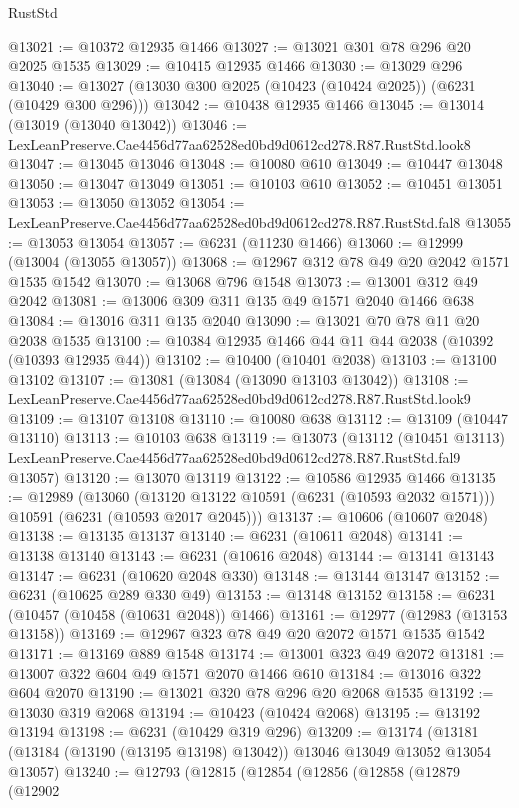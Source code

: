 \begin{lexlean}{RustStd}
\begin{coremodule}
{{@13021 := @10372 @12935 @1466
@13027 := @13021 @301 @78 @296 @20 @2025 @1535
@13029 := @10415 @12935 @1466
@13030 := @13029 @296
@13040 := @13027 (@13030 @300 @2025 (@10423 (@10424 @2025)) (@6231 (@10429 @300 @296)))
@13042 := @10438 @12935 @1466
@13045 := @13014 (@13019 (@13040 @13042))
@13046 := LexLeanPreserve.Cae4456d77aa62528ed0bd9d0612cd278.R87.RustStd.look8
@13047 := @13045 @13046
@13048 := @10080 @610
@13049 := @10447 @13048
@13050 := @13047 @13049
@13051 := @10103 @610
@13052 := @10451 @13051
@13053 := @13050 @13052
@13054 := LexLeanPreserve.Cae4456d77aa62528ed0bd9d0612cd278.R87.RustStd.fal8
@13055 := @13053 @13054
@13057 := @6231 (@11230 @1466)
@13060 := @12999 (@13004 (@13055 @13057))
@13068 := @12967 @312 @78 @49 @20 @2042 @1571 @1535 @1542
@13070 := @13068 @796 @1548
@13073 := @13001 @312 @49 @2042
@13081 := @13006 @309 @311 @135 @49 @1571 @2040 @1466 @638
@13084 := @13016 @311 @135 @2040
@13090 := @13021 @70 @78 @11 @20 @2038 @1535
@13100 := @10384 @12935 @1466 @44 @11 @44 @2038 (@10392 (@10393 @12935 @44))
@13102 := @10400 (@10401 @2038)
@13103 := @13100 @13102
@13107 := @13081 (@13084 (@13090 @13103 @13042))
@13108 := LexLeanPreserve.Cae4456d77aa62528ed0bd9d0612cd278.R87.RustStd.look9
@13109 := @13107 @13108
@13110 := @10080 @638
@13112 := @13109 (@10447 @13110)
@13113 := @10103 @638
@13119 := @13073
    (@13112
      (@10451 @13113)
      LexLeanPreserve.Cae4456d77aa62528ed0bd9d0612cd278.R87.RustStd.fal9
      @13057)
@13120 := @13070 @13119
@13122 := @10586 @12935 @1466
@13135 := @12989
    (@13060 (@13120 @13122 @10591 (@6231 (@10593 @2032 @1571))) @10591 (@6231 (@10593 @2017 @2045)))
@13137 := @10606 (@10607 @2048)
@13138 := @13135 @13137
@13140 := @6231 (@10611 @2048)
@13141 := @13138 @13140
@13143 := @6231 (@10616 @2048)
@13144 := @13141 @13143
@13147 := @6231 (@10620 @2048 @330)
@13148 := @13144 @13147
@13152 := @6231 (@10625 @289 @330 @49)
@13153 := @13148 @13152
@13158 := @6231 (@10457 (@10458 (@10631 @2048)) @1466)
@13161 := @12977 (@12983 (@13153 @13158))
@13169 := @12967 @323 @78 @49 @20 @2072 @1571 @1535 @1542
@13171 := @13169 @889 @1548
@13174 := @13001 @323 @49 @2072
@13181 := @13007 @322 @604 @49 @1571 @2070 @1466 @610
@13184 := @13016 @322 @604 @2070
@13190 := @13021 @320 @78 @296 @20 @2068 @1535
@13192 := @13030 @319 @2068
@13194 := @10423 (@10424 @2068)
@13195 := @13192 @13194
@13198 := @6231 (@10429 @319 @296)
@13209 := @13174
    (@13181 (@13184 (@13190 (@13195 @13198) @13042)) @13046 @13049 @13052 @13054 @13057)
@13240 := @12793
    (@12815
      (@12854
        (@12856
          (@12858
            (@12879
              (@12902
}}
\end{coremodule}
\end{lexlean}
